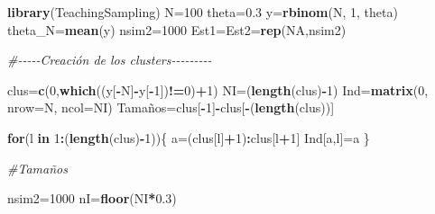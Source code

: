 \documentclass[
  spanish,
  12pt,
]{book}
\newenvironment{Shaded}{\begin{snugshade}}{\end{snugshade}}
\newcommand{\AttributeTok}[1]{\textcolor[rgb]{0.13,0.29,0.53}{#1}}
\newcommand{\CommentTok}[1]{\textcolor[rgb]{0.56,0.35,0.01}{\textit{#1}}}
\newcommand{\ConstantTok}[1]{\textcolor[rgb]{0.56,0.35,0.01}{#1}}
\newcommand{\ControlFlowTok}[1]{\textcolor[rgb]{0.13,0.29,0.53}{\textbf{#1}}}
\newcommand{\DecValTok}[1]{\textcolor[rgb]{0.00,0.00,0.81}{#1}}
\newcommand{\FloatTok}[1]{\textcolor[rgb]{0.00,0.00,0.81}{#1}}
\newcommand{\FunctionTok}[1]{\textcolor[rgb]{0.13,0.29,0.53}{\textbf{#1}}}
\newcommand{\NormalTok}[1]{#1}
\newcommand{\OtherTok}[1]{\textcolor[rgb]{0.56,0.35,0.01}{#1}}
\newcommand{\SpecialCharTok}[1]{\textcolor[rgb]{0.81,0.36,0.00}{\textbf{#1}}}
\begin{document}
\begin{Shaded}
\begin{Highlighting}[]
\FunctionTok{library}\NormalTok{(TeachingSampling)}
\NormalTok{N}\OtherTok{=}\DecValTok{100}
\NormalTok{theta}\OtherTok{=}\FloatTok{0.3}
\NormalTok{y}\OtherTok{=}\FunctionTok{rbinom}\NormalTok{(N, }\DecValTok{1}\NormalTok{, theta)}
\NormalTok{theta\_N}\OtherTok{=}\FunctionTok{mean}\NormalTok{(y)}
\NormalTok{nsim2}\OtherTok{=}\DecValTok{1000}
\NormalTok{Est1}\OtherTok{=}\NormalTok{Est2}\OtherTok{=}\FunctionTok{rep}\NormalTok{(}\ConstantTok{NA}\NormalTok{,nsim2)}

\CommentTok{\#{-}{-}{-}{-}{-}Creación de los clusters{-}{-}{-}{-}{-}{-}{-}{-}{-}}

\NormalTok{clus}\OtherTok{=}\FunctionTok{c}\NormalTok{(}\DecValTok{0}\NormalTok{,}\FunctionTok{which}\NormalTok{((y[}\SpecialCharTok{{-}}\NormalTok{N]}\SpecialCharTok{{-}}\NormalTok{y[}\SpecialCharTok{{-}}\DecValTok{1}\NormalTok{])}\SpecialCharTok{!=}\DecValTok{0}\NormalTok{)}\SpecialCharTok{+}\DecValTok{1}\NormalTok{)}
\NormalTok{NI}\OtherTok{=}\NormalTok{(}\FunctionTok{length}\NormalTok{(clus)}\SpecialCharTok{{-}}\DecValTok{1}\NormalTok{)}
\NormalTok{Ind}\OtherTok{=}\FunctionTok{matrix}\NormalTok{(}\DecValTok{0}\NormalTok{, }\AttributeTok{nrow=}\NormalTok{N, }\AttributeTok{ncol=}\NormalTok{NI)}
\NormalTok{Tamaños}\OtherTok{=}\NormalTok{clus[}\SpecialCharTok{{-}}\DecValTok{1}\NormalTok{]}\SpecialCharTok{{-}}\NormalTok{clus[}\SpecialCharTok{{-}}\NormalTok{(}\FunctionTok{length}\NormalTok{(clus))]}

\ControlFlowTok{for}\NormalTok{(l }\ControlFlowTok{in} \DecValTok{1}\SpecialCharTok{:}\NormalTok{(}\FunctionTok{length}\NormalTok{(clus)}\SpecialCharTok{{-}}\DecValTok{1}\NormalTok{))\{}
\NormalTok{a}\OtherTok{=}\NormalTok{(clus[l]}\SpecialCharTok{+}\DecValTok{1}\NormalTok{)}\SpecialCharTok{:}\NormalTok{clus[l}\SpecialCharTok{+}\DecValTok{1}\NormalTok{]}
\NormalTok{Ind[a,l]}\OtherTok{=}\NormalTok{a}
\NormalTok{\}}

\CommentTok{\#Tamaños}

\NormalTok{nsim2}\OtherTok{=}\DecValTok{1000}
\NormalTok{nI}\OtherTok{=}\FunctionTok{floor}\NormalTok{(NI}\SpecialCharTok{*}\FloatTok{0.3}\NormalTok{)}


\end{Highlighting}
\end{Shaded}
\end{document}
